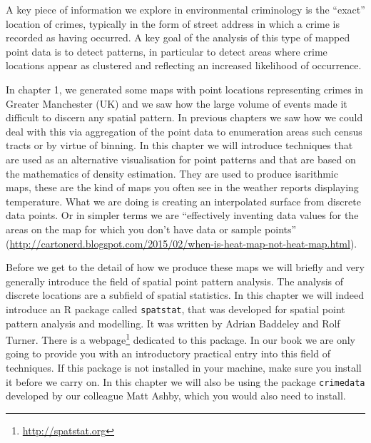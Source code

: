 \documentclass[
  krantz2]{krantz}
\renewcommand{\href}[2]{#2\footnote{\url{#1}}}
\begin{document}
A key piece of information we explore in environmental criminology is the ``exact'' location of crimes, typically in the form of street address in which a crime is recorded as having occurred. A key goal of the analysis of this type of mapped point data is to detect patterns, in particular to detect areas where crime locations appear as clustered and reflecting an increased likelihood of occurrence.

In chapter 1, we generated some maps with point locations representing crimes in Greater Manchester (UK) and we saw how the large volume of events made it difficult to discern any spatial pattern. In previous chapters we saw how we could deal with this via aggregation of the point data to enumeration areas such census tracts or by virtue of binning. In this chapter we will introduce techniques that are used as an alternative visualisation for point patterns and that are based on the mathematics of density estimation. They are used to produce isarithmic maps, these are the kind of maps you often see in the weather reports displaying temperature. What we are doing is creating an interpolated surface from discrete data points. Or in simpler terms we are ``effectively inventing data values for the areas on the map for which you don't have data or sample points'' (\url{http://cartonerd.blogspot.com/2015/02/when-is-heat-map-not-heat-map.html}).

Before we get to the detail of how we produce these maps we will briefly and very generally introduce the field of spatial point pattern analysis. The analysis of discrete locations are a subfield of spatial statistics. In this chapter we will indeed introduce an R package called \texttt{spatstat}, that was developed for spatial point pattern analysis and modelling. It was written by Adrian Baddeley and Rolf Turner. There is a \href{http://spatstat.org}{webpage} dedicated to this package. In our book we are only going to provide you with an introductory practical entry into this field of techniques. If this package is not installed in your machine, make sure you install it before we carry on. In this chapter we will also be using the package \texttt{crimedata} developed by our colleague Matt Ashby, which you would also need to install.
\end{document}
